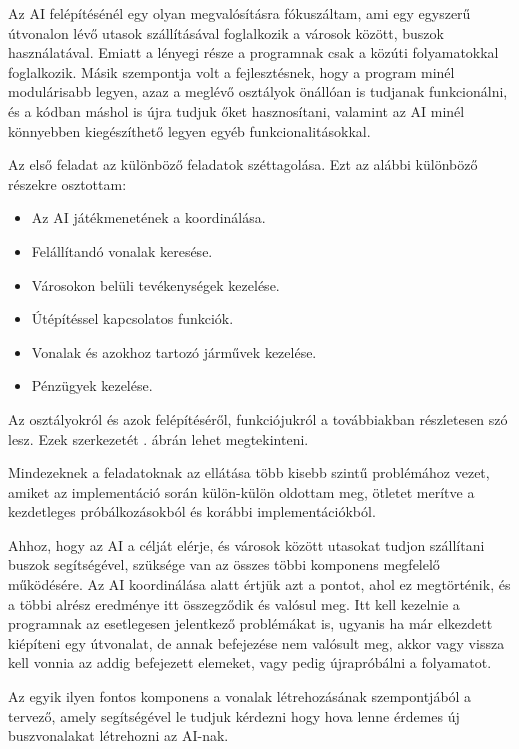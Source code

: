 
Az AI felépítésénél egy olyan megvalósításra fókuszáltam, ami egy egyszerű útvonalon lévő utasok szállításával foglalkozik a városok között, buszok használatával. Emiatt a lényegi része a programnak csak a közúti folyamatokkal foglalkozik. Másik szempontja volt a fejlesztésnek, hogy a program minél modulárisabb legyen, azaz a meglévő osztályok önállóan is tudjanak funkcionálni, és a kódban máshol is újra tudjuk őket hasznosítani, valamint az AI minél könnyebben kiegészíthető legyen egyéb funkcionalitásokkal.


Az első feladat az különböző feladatok széttagolása. Ezt az alábbi különböző részekre osztottam:
\begin{itemize}
	\item Az AI játékmenetének a koordinálása.
	\item Felállítandó vonalak keresése.
	\item Városokon belüli tevékenységek kezelése.
	\item Útépítéssel kapcsolatos funkciók.
	\item Vonalak és azokhoz tartozó járművek kezelése.
	\item Pénzügyek kezelése.
\end{itemize}

Az osztályokról és azok felépítéséről, funkciójukról a továbbiakban részletesen szó lesz. Ezek szerkezetét . ábrán lehet megtekinteni.

Mindezeknek a feladatoknak az ellátása több kisebb szintű problémához vezet, amiket az implementáció során külön-külön oldottam meg, ötletet merítve a kezdetleges próbálkozásokból és korábbi implementációkból.

Ahhoz, hogy az AI a célját elérje, és városok között utasokat tudjon szállítani buszok segítségével, szüksége van az összes többi komponens megfelelő működésére. Az AI koordinálása alatt értjük azt a pontot, ahol ez megtörténik, és a többi alrész eredménye itt összegződik és valósul meg. Itt kell kezelnie a programnak az esetlegesen jelentkező problémákat is, ugyanis ha már elkezdett kiépíteni egy útvonalat, de annak befejezése nem valósult meg, akkor vagy vissza kell vonnia az addig befejezett elemeket, vagy pedig újrapróbálni a folyamatot.

Az egyik ilyen fontos komponens a vonalak létrehozásának szempontjából a tervező, amely segítségével le tudjuk kérdezni hogy hova lenne érdemes új buszvonalakat létrehozni az AI-nak.

